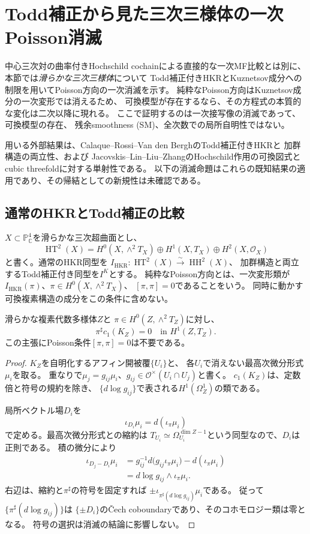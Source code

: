 \section{Todd補正から見た三次三様体の一次Poisson消滅}
\label{pf:sec:first-order}
中心三次対の曲率付きHochschild cochainによる直接的な一次MF比較とは別に、
本節では\emph{滑らかな三次三様体}について
Todd補正付きHKRとKuznetsov成分への制限を用いてPoisson方向の一次消滅を示す。
純粋なPoisson方向はKuznetsov成分の一次変形では消えるため、
可換模型が存在するなら、その方程式の本質的な変化は二次以降に現れる。
ここで証明するのは一次接写像の消滅であって、可換模型の存在、
残余smoothness (SM)、全次数での局所自明性ではない。

用いる外部結果は、Calaque--Rossi--Van den BerghのTodd補正付きHKRと
加群構造の両立性\cite[Theorem 1.4]{PFCRVdB}、および
Jacovskis--Lin--Liu--ZhangのHochschild作用の可換図式と
cubic threefoldに対する単射性\cite[Theorems 3.10 and 4.4(2)]{JLLZ}である。
以下の消滅命題はこれらの既知結果の適用であり、その帰結としての新規性は未確認である。

\subsection{通常のHKRとTodd補正の比較}
$X\subset\mathbb P^4_{\mathbb C}$を滑らかな三次超曲面とし、
\[
 \operatorname{HT}^2(X)
 =H^0(X,\wedge^2T_X)\oplus H^1(X,T_X)\oplus H^2(X,\mathcal O_X)
\]
と書く。通常のHKR同型を
$I_{\mathrm{HKR}}:\operatorname{HT}^2(X)\xrightarrow{\sim}\operatorname{HH}^2(X)$、
加群構造と両立するTodd補正付き同型を$I^K$とする。
純粋なPoisson方向とは、一次変形類が
$I_{\mathrm{HKR}}(\pi)$、$\pi\in H^0(X,\wedge^2T_X)$、
$[\pi,\pi]=0$であることをいう。
同時に動かす可換複素構造の成分をこの条件に含めない。

\begin{lemma}[bivectorによる第一Chern類の縮約]
\label{pf:lem:chern}
滑らかな複素代数多様体$Z$と
$\pi\in H^0(Z,\wedge^2T_Z)$に対し、
\[
 \pi^\sharp c_1(K_Z)=0\quad\text{in }H^1(Z,T_Z).
\]
この主張にPoisson条件$[\pi,\pi]=0$は不要である。
\end{lemma}
\begin{proof}
$K_Z$を自明化するアフィン開被覆$\{U_i\}$と、
各$U_i$で消えない最高次微分形式$\mu_i$を取る。
重なりで$\mu_j=g_{ij}\mu_i$、$g_{ij}\in\mathcal O^\times(U_i\cap U_j)$と書く。
$c_1(K_Z)$は、定数倍と符号の規約を除き、
$\{d\log g_{ij}\}$で表される$H^1(\Omega_Z^1)$の類である。

局所ベクトル場$D_i$を
\[
 \iota_{D_i}\mu_i=d(\iota_\pi\mu_i)
\]
で定める。最高次微分形式との縮約は
$T_{U_i}\simeq\Omega^{\dim Z-1}_{U_i}$という同型なので、$D_i$は正則である。
積の微分により
\begin{align*}
 \iota_{D_j-D_i}\mu_i
 &=g_{ij}^{-1}d\bigl(g_{ij}\iota_\pi\mu_i\bigr)
       -d(\iota_\pi\mu_i)\\
 &=d\log g_{ij}\wedge\iota_\pi\mu_i.
\end{align*}
右辺は、縮約と$\pi^\sharp$の符号を固定すれば
$\pm\iota_{\pi^\sharp(d\log g_{ij})}\mu_i$である。
従って$\{\pi^\sharp(d\log g_{ij})\}$は
$\{\pm D_i\}$の\v{C}ech coboundaryであり、そのコホモロジー類は零となる。
符号の選択は消滅の結論に影響しない。
\end{proof}


